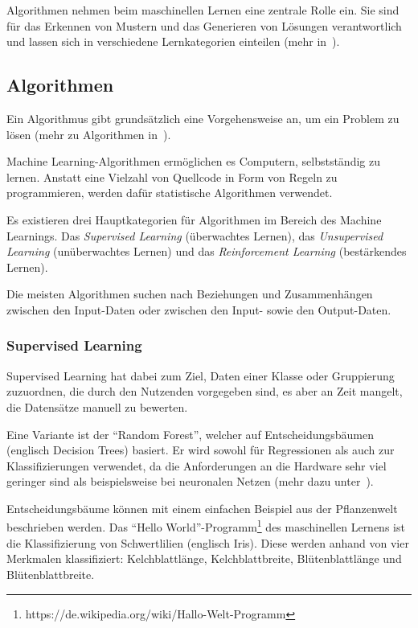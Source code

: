 Algorithmen nehmen beim maschinellen Lernen eine zentrale Rolle ein. Sie sind für das Erkennen von Mustern und das
Generieren von Lösungen verantwortlich und lassen sich in verschiedene Lernkategorien einteilen
(mehr in~\cite{book_grundlagen_machinelearning}).

\subsection{Algorithmen}
Ein Algorithmus gibt grundsätzlich eine Vorgehensweise an, um ein Problem zu lösen (mehr zu Algorithmen
in~\cite{book_grundlagen_algorithmen}).

Machine Learning-Algorithmen ermöglichen es Computern, selbstständig zu lernen. Anstatt eine Vielzahl von Quellcode in
Form von Regeln zu programmieren, werden dafür statistische Algorithmen verwendet.

Es existieren drei Hauptkategorien für Algorithmen im Bereich des Machine Learnings. Das \textit{Supervised Learning}
(überwachtes Lernen), das \textit{Unsupervised Learning} (unüberwachtes Lernen) und das \textit{Reinforcement Learning}
(bestärkendes Lernen).

Die meisten Algorithmen suchen nach Beziehungen und Zusammenhängen zwischen den Input-Daten oder zwischen den Input-
sowie den Output-Daten.

\subsubsection{Supervised Learning}
Supervised Learning hat dabei zum Ziel, Daten einer Klasse oder Gruppierung zuzuordnen, die durch den Nutzenden
vorgegeben sind, es aber an Zeit mangelt, die Datensätze manuell zu bewerten.

Eine Variante ist der \enquote{Random Forest}, welcher auf Entscheidungsbäumen (englisch Decision Trees) basiert. Er
wird sowohl für Regressionen als auch zur Klassifizierungen verwendet, da die Anforderungen an die Hardware sehr viel
geringer sind als beispielsweise bei neuronalen Netzen (mehr dazu unter~\cite{book_grundlagen_learnings}).

Entscheidungsbäume können mit einem einfachen Beispiel aus der Pflanzenwelt beschrieben werden. Das
\enquote{Hello World}-Programm\footnote{https://de.wikipedia.org/wiki/Hallo-Welt-Programm} des maschinellen Lernens ist
die Klassifizierung von Schwertlilien (englisch Iris). Diese werden anhand von vier Merkmalen klassifiziert:
Kelchblattlänge, Kelchblattbreite, Blütenblattlänge und Blütenblattbreite.

